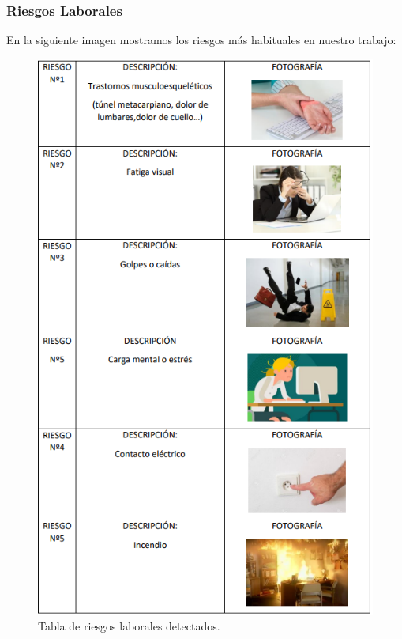 \subsubsection{Riesgos Laborales}

En la siguiente imagen mostramos los riesgos más habituales en nuestro trabajo:

\begin{figure}[H]
    \centering
    \includegraphics[width=1.0\textwidth]{Fol/tablaRiesgos.PNG}
    \caption{Tabla de riesgos laborales detectados.}
\end{figure}

